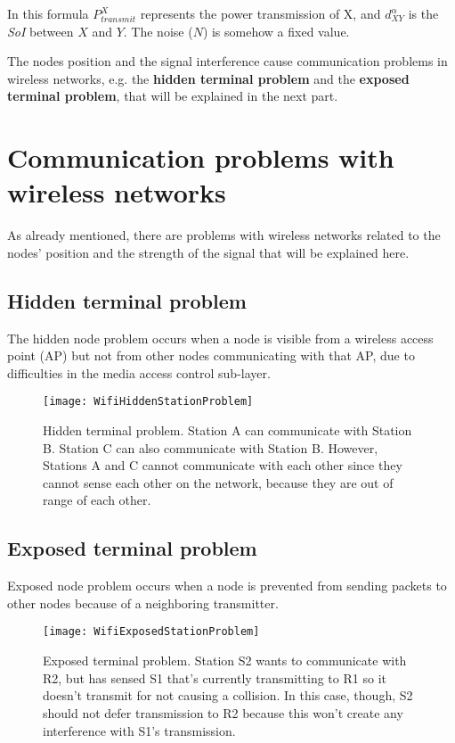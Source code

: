 In this formula $P^{X}_{transmit}$ represents the power transmission of X, and
$d^{\alpha}_{XY}$ is the \textit{SoI} between $X$ and $Y$. The noise ($N$) is
somehow a fixed value.

The nodes position and the signal interference cause communication problems in
wireless networks, e.g. the \textbf{hidden terminal problem} and the \textbf{
  exposed terminal problem}, that will be explained in the next part.

\section{Communication problems with wireless networks}

As already mentioned, there are problems with wireless networks related to the
nodes' position and the strength of the signal that will be explained here.

\subsection{Hidden terminal problem}

The hidden node problem occurs when a node is visible from a wireless access
point (AP) but not from other nodes communicating with that AP, due to
difficulties in the media access control sub-layer.

\begin{figure}[t]
  \centering
  \texttt{[image: WifiHiddenStationProblem]}
  \caption[Hidden terminal problem]{Hidden terminal problem. Station A can
    communicate with Station B. Station C can also communicate with Station B.
    However, Stations A and C cannot communicate with each other since they
    cannot sense each other on the network, because they are out of range of
    each other.}
\end{figure}

\subsection{Exposed terminal problem}

Exposed node problem occurs when a node is prevented from sending packets to
other nodes because of a neighboring transmitter.

\begin{figure}[t]
  \centering
  \texttt{[image: WifiExposedStationProblem]}
  \caption[Exposed terminal problem]{Exposed terminal problem. Station S2
    wants to communicate with R2, but has sensed S1 that's currently
    transmitting to R1 so it doesn't transmit for not causing a collision. In
    this case, though, S2 should not defer transmission to R2 because this won't
    create any interference with S1's transmission.}
\end{figure}

